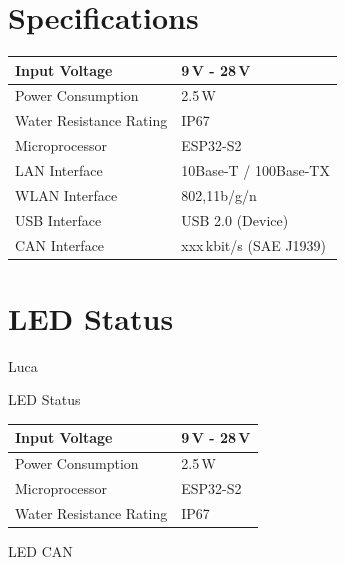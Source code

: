 \section{Specifications}
\begin{center}
    \begin{tabular}{p{6.8cm} p{6.8cm}}
    \hline
    Input Voltage           & 9\,V - 28\,V                      \\ \hline
    Power Consumption       & 2.5\,W                            \\ \hline
    Water Resistance Rating & IP67                              \\ \hline  
    Microprocessor          & ESP32-S2                          \\ \hline
    LAN Interface           & 10Base-T / 100Base-TX             \\ \hline
    WLAN Interface          & 802,11b/g/n                       \\ \hline
    USB Interface           & USB 2.0 (Device)                  \\ \hline
    CAN Interface           & xxx\,kbit/s (SAE J1939)           \\ \hline
    
    \end{tabular}
\end{center}



\section{LED Status}
Luca

LED Status

\begin{center}
    \begin{tabular}{p{6.8cm} p{6.8cm}}
    \hline
    Input Voltage           & 9\,V - 28\,V  \\ \hline
    Power Consumption       & 2.5\,W        \\ \hline
    Microprocessor          & ESP32-S2      \\ \hline
    Water Resistance Rating & IP67          \\ \hline       
    \end{tabular}
\end{center}

LED CAN

